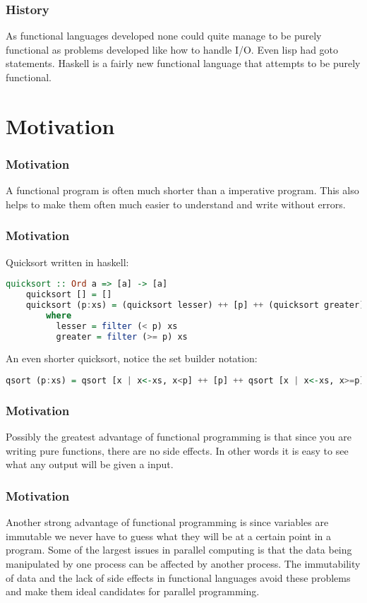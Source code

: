 \documentclass[presentation.tex]{subfiles}
\begin{document}
\begin{frame}
  \frametitle{History}
  As functional languages developed none could quite manage to be purely functional as problems developed like how to handle I/O. Even lisp had goto statements.
  \vspace{\baselineskip}
  Haskell is a fairly new functional language that attempts to be purely functional.
\end{frame}


\section{Motivation}
\begin{frame}
  \frametitle{Motivation}
  A functional program is often much shorter than a imperative program. This also helps to make them often much easier to understand and write without errors.
\end{frame}

\begin{frame}[fragile]
  \frametitle{Motivation}
  Quicksort written in haskell:
  \begin{lstlisting}[language=Haskell]
    quicksort :: Ord a => [a] -> [a]
    quicksort [] = []
    quicksort (p:xs) = (quicksort lesser) ++ [p] ++ (quicksort greater)
        where
          lesser = filter (< p) xs
          greater = filter (>= p) xs
  \end{lstlisting}
  \vspace{\baselineskip}
  An even shorter quicksort, notice the set builder notation:
  \begin{lstlisting}[language=Haskell]
    qsort (p:xs) = qsort [x | x<-xs, x<p] ++ [p] ++ qsort [x | x<-xs, x>=p]
  \end{lstlisting}
\end{frame}

\begin{frame}
  \frametitle{Motivation}
  Possibly the greatest advantage of functional programming is that since you are writing pure functions, there are no side effects.
  \vspace{\baselineskip}
  In other words it is easy to see what any output will be given a input.
\end{frame}

\begin{frame}
  \frametitle{Motivation}
  Another strong advantage of functional programming is since variables are immutable we never have to guess what they will be at a certain point in a program.
  \vspace{\baselineskip}
  Some of the largest issues in parallel computing is that the data being manipulated by one process can be affected by another process. The immutability of data and the lack of side effects in functional languages avoid these problems and make them ideal candidates for parallel programming.
\end{frame}
\end{document}
